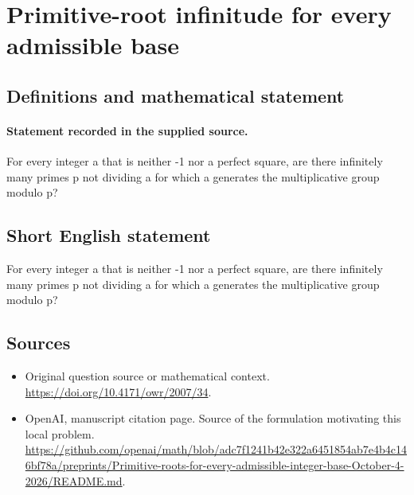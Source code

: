 \documentclass[11pt]{article}
\begin{document}
\section*{Primitive-root infinitude for every admissible base}\label{30007255}
\subsection{Definitions and mathematical statement}
\paragraph{Statement recorded in the supplied source.}
For every integer a that is neither -1 nor a perfect square, are there infinitely many primes p not dividing a for which a generates the multiplicative group modulo p?
\subsection{Short English statement}
For every integer a that is neither -1 nor a perfect square, are there infinitely many primes p not dividing a for which a generates the multiplicative group modulo p?
\subsection{Sources}
\begin{itemize}
\item[S1] Original question source or mathematical context.
\url{https://doi.org/10.4171/owr/2007/34}.
\item[S2] OpenAI, manuscript citation page. Source of the formulation motivating this local problem.
\url{https://github.com/openai/math/blob/adc7f1241b42e322a6451854ab7e4b4c146bf78a/preprints/Primitive-roots-for-every-admissible-integer-base-October-4-2026/README.md}.
\end{itemize}
\end{document}
